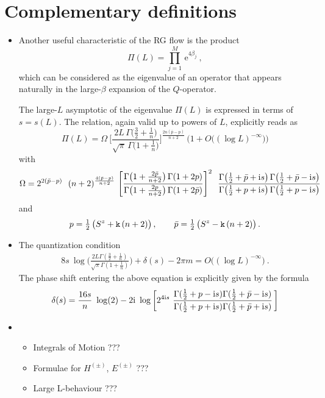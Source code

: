 \documentclass[12pt]{article}
\def\bea{\begin{eqnarray}}
\def\eea{\end{eqnarray}}
\def\be{\begin{equation}}
\def\ee{\end{equation}}
\def\be{\begin{equation}}
\def\ee{\end{equation}}
\def\bea{\begin{eqnarray}}
\def\eea{\end{eqnarray}}
\def\ri{{\rm i}}
\newcommand{\re}{\mbox{e}}
\begin{document}
\section{Complementary definitions}
\begin{itemize}

\item
Another useful characteristic of the RG flow is the product 
\be
\Pi(L)=\prod_{j=1}^M\,\re^{4\beta_j}\ ,
\ee
which can be considered as the eigenvalue of an operator that appears
naturally in the large-$\beta$ expansion of the $Q$-operator.

The large-$L$ asymptotic of the eigenvalue $\Pi(L)$ is expressed in terms of $s=s(L)$.
The relation, again valid up to powers of $L$, explicitly 
reads as
\be
\Pi(L)=\Omega\ \bigg[\frac{2 L\,\Gamma\big(\frac{3}{2}+\frac{1}{n}\big)}{\sqrt{\pi}\,\Gamma\big(1+\frac{1}{n}\big)}\bigg]^{\frac{2n(\bar{p}-p)}{n+2}}\,
\big(1+O\big((\log L)^{-\infty}\big)\big)
\ee
with
\be
\Omega= 2^{2({\bar p}-p)}\ \ 
(n+2)^{\frac{4(\bar{p}-p)}{n+2}} \ \Bigg[\frac{\Gamma\big(1+\frac{2\bar{p}}{n+2}\big)\,\Gamma(1+2p)}
{\Gamma\big(1+\frac{2p}{n+2}\big)\,\Gamma(1+2\bar{p})}\Bigg]^2\ 
\ \frac{\Gamma\big(\frac{1}{2}+\bar{p}+\ri s\big)\,\Gamma\big(\frac{1}{2}+\bar{p}-\ri s\big)}
{\Gamma\big(\frac{1}{2}+p+\ri s\big)\,\Gamma\big(\frac{1}{2}+p-\ri s\big)}\,\ 
\ee
and 
\be
p=\tfrac{1}{2}\,\big(S^z+{\tt k}\,(n+2)\big)\, , \qquad \bar{p}=\tfrac{1}{2}\,\big(S^z-{\tt k}\,(n+2)\big)\, .
\ee

\item
The quantization condition
\bea
8s\  \log\bigg(\frac{2L\Gamma(\frac{3}{2}+\frac{1}{n})}{\sqrt{\pi}\Gamma(1+\frac{1}{n})}\bigg)
+\delta(s)-2\pi m=O\big((\log L)^{-\infty}\big)\ .
\eea
The phase shift entering the above equation is explicitly given by the formula
\bea
\delta(s)=\frac{16s}{n}\ \log(2)-2\ri\ \log\bigg[2^{4\ri s}
\ \frac{\Gamma(\frac{1}{2}+p-{\ri s})\Gamma(\frac{1}{2}+{\bar p}-{\ri s})}{\Gamma(\frac{1}{2}+p+{\ri s})\Gamma(\frac{1}{2}+{\bar p}+{\ri s})}\, \bigg]
\eea

\item
\begin{itemize}
\item
Integrals of Motion ???
\item
Formulae for $H^{(\pm)}$, $E^{(\pm)}$ ???
\item
Large L-behaviour ???
\end{itemize}

\end{itemize}
\end{document}
